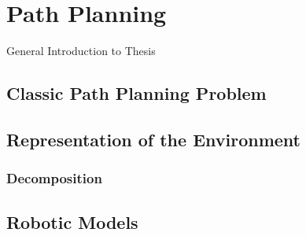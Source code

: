 \chapter{Path Planning}\label{ch:introductionplanning}
General Introduction to Thesis

\section{Classic Path Planning Problem}\label{sec:basic}

\section{Representation of the Environment}\label{sec:representation}
\subsection{Decomposition}\label{sec:decomposition}

\section{Robotic Models}\label{sec:model}





